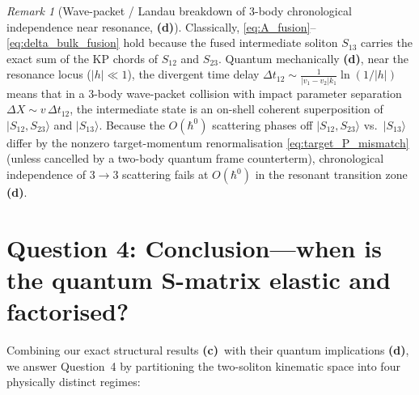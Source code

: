 \documentclass[11pt,a4paper]{article}
\newcommand{\Lc}{\textsf{\textbf{(c)}}\xspace}
\newcommand{\Ld}{\textsf{\textbf{(d)}}\xspace}
\newcommand{\hb}{\hbar}
\theoremstyle{remark}
\newtheorem{remark}[proposition]{Remark}
\begin{document}
\begin{remark}[Wave-packet / Landau breakdown of 3-body chronological independence near resonance, \Ld]
Classically, \eqref{eq:A_fusion}--\eqref{eq:delta_bulk_fusion} hold because the
fused intermediate soliton $S_{13}$ carries the exact sum of the KP chords of
$S_{12}$ and $S_{23}$. Quantum mechanically \Ld, near the resonance locus
($|h|\ll 1$), the divergent time delay $\Delta t_{12} \sim \frac{1}{|v_1-v_2|k_1}\ln(1/|h|)$
means that in a 3-body wave-packet collision with impact parameter separation
$\Delta X \sim v\,\Delta t_{12}$, the intermediate state is an on-shell coherent
superposition of $|S_{12},S_{23}\rangle$ and $|S_{13}\rangle$. Because the $O(\hb^0)$
scattering phases off $|S_{12},S_{23}\rangle$ vs.\ $|S_{13}\rangle$ differ by the
nonzero target-momentum renormalisation \eqref{eq:target_P_mismatch} (unless
cancelled by a two-body quantum frame counterterm), chronological independence of
$3\to 3$ scattering fails at $O(\hb^0)$ in the resonant transition zone \Ld.
\end{remark}

\section{Question 4: Conclusion---when is the quantum S-matrix elastic and factorised?}
\label{sec:conclusion}

Combining our exact structural results \Lc\ with their quantum implications \Ld,
we answer Question~4 by partitioning the two-soliton kinematic space into four
physically distinct regimes:
\end{document}
